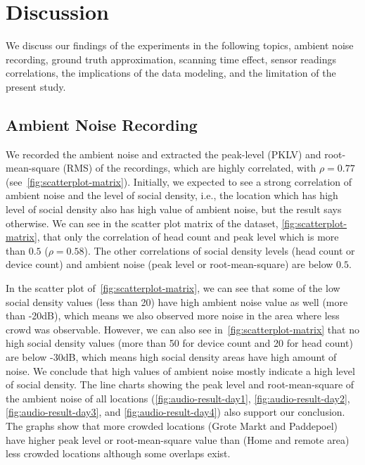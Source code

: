 \chapter{Discussion}
\label{ch:discussion} %
We discuss our findings of the experiments in the following topics, ambient noise recording, ground truth approximation, scanning time effect, sensor readings correlations, the implications of the data modeling, and the limitation of the present study.

\section{Ambient Noise Recording} %
\label{sec:ambient_noise_recording}
We recorded the ambient noise and extracted the peak-level (\ac{PKLV}) and root-mean-square (\ac{RMS}) of the recordings, which are highly correlated, with $\rho=0.77$ (see~\autoref{fig:scatterplot-matrix}). Initially, we expected to see a strong correlation of ambient noise and the level of social density, i.e., the location which has high level of social density also has high value of ambient noise, but the result says otherwise. We can see in the scatter plot matrix of the dataset, \autoref{fig:scatterplot-matrix}, that only the correlation of head count and peak level which is more than $0.5$ ($\rho=0.58$). The other correlations of social density levels (head count or device count) and ambient noise (peak level or root-mean-square) are below $0.5$.

In the scatter plot of~\autoref{fig:scatterplot-matrix}, we can see that some of the low social density values (less than 20) have high ambient noise value as well (more than -20dB), which means we also observed more noise in the area where less crowd was observable. However, we can also see in~\autoref{fig:scatterplot-matrix} that no high social density values (more than 50 for device count and 20 for head count) are below -30dB, which means high social density areas have high amount of noise. We conclude that high values of ambient noise mostly indicate a high level of social density. The line charts showing the peak level and root-mean-square of the ambient noise of all locations (\autoref{fig:audio-result-day1}, \autoref{fig:audio-result-day2}, \autoref{fig:audio-result-day3}, and \autoref{fig:audio-result-day4}) also support our conclusion. The graphs show that more crowded locations (Grote Markt and Paddepoel) have higher peak level or root-mean-square value than (Home and remote area) less crowded locations although some overlaps exist.

